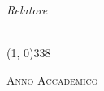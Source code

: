 \begin{titlepage}
\begin{center}
\begin{normalsize}
            \begin{flushright}
                \textit{Relatore}\\
                \profTitle\ \myProf
            \end{flushright}
        \end{normalsize}

        \vspace*{\fill}

        \line(1, 0){338} \\
        \begin{normalsize}
            \textsc{Anno Accademico \myAA}
        \end{normalsize}
    \end{center}
\end{titlepage}
